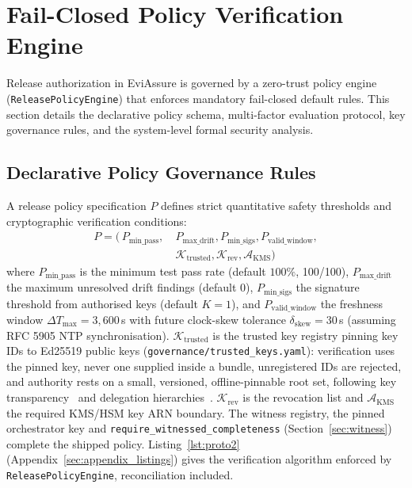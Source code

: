 \documentclass[letterpaper,10pt,twocolumn]{article}
\theoremstyle{definition}
\begin{document}
\section{Fail-Closed Policy Verification Engine}
Release authorization in EviAssure is governed by a zero-trust policy engine (\textnormal{\texttt{ReleasePolicyEngine}}) that enforces mandatory fail-closed default rules. This section details the declarative policy schema, multi-factor evaluation protocol, key governance rules, and the system-level formal security analysis.

\subsection{Declarative Policy Governance Rules}
A release policy specification $P$ defines strict quantitative safety thresholds and cryptographic verification conditions:
\begin{equation}
\begin{split}
P = (\,P_{\text{min\_pass}},\ &P_{\text{max\_drift}}, P_{\text{min\_sigs}}, P_{\text{valid\_window}},\\
&\mathcal{K}_{\text{trusted}}, \mathcal{K}_{\text{rev}}, \mathcal{A}_{\text{KMS}})
\end{split}
\end{equation}
where $P_{\text{min\_pass}}$ is the minimum test pass rate (default $100\%$, 100/100), $P_{\text{max\_drift}}$ the maximum unresolved drift findings (default $0$), $P_{\text{min\_sigs}}$ the signature threshold from authorised keys (default $K=1$), and $P_{\text{valid\_window}}$ the freshness window $\Delta T_{\text{max}} = 3{,}600$\,s with future clock-skew tolerance $\delta_{\text{skew}} = 30$\,s (assuming RFC 5905 NTP synchronisation). $\mathcal{K}_{\text{trusted}}$ is the trusted key registry pinning key IDs to Ed25519 public keys (\nolinkurl{governance/trusted_keys.yaml}): verification uses the pinned key, never one supplied inside a bundle, unregistered IDs are rejected, and authority rests on a small, versioned, offline-pinnable root set, following key transparency~\cite{melara2015coniks} and delegation hierarchies~\cite{kuppusamy2016tuf}. $\mathcal{K}_{\text{rev}}$ is the revocation list and $\mathcal{A}_{\text{KMS}}$ the required KMS/HSM key ARN boundary. The witness registry, the pinned orchestrator key and \nolinkurl{require_witnessed_completeness} (Section~\ref{sec:witness}) complete the shipped policy. Listing~\ref{lst:proto2} (Appendix~\ref{sec:appendix_listings}) gives the verification algorithm enforced by \textnormal{\texttt{ReleasePolicyEngine}}, reconciliation included.
\end{document}
